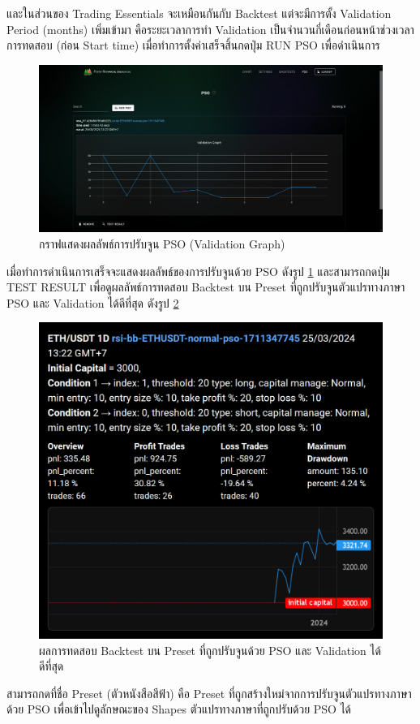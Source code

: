 และในส่วนของ Trading Essentials จะเหมือนกันกับ Backtest แต่จะมีการตั้ง Validation Period (months) เพิ่มเข้ามา คือระยะเวลาการทำ Validation เป็นจำนวนกี่เดือนก่อนหน้าช่วงเวลาการทดสอบ (ก่อน Start time) เมื่อทำการตั้งค่าเสร็จสิ้นกดปุ่ม RUN PSO เพื่อดำเนินการ
\begin{figure}[ht]
    \centering
    \includegraphics[width=\textwidth]{images/web-tuts/pso-result.PNG}
    \caption{กราฟแสดงผลลัพธ์การปรับจูน PSO (Validation Graph)}
    \label{fig:pso-result}
\end{figure}
\FloatBarrier
เมื่อทำการดำเนินการเสร็จจะแสดงผลลัพธ์ของการปรับจูนด้วย PSO ดังรูป \ref{fig:pso-result} และสามารถกดปุ่ม TEST RESULT เพื่อดูผลลัพธ์การทดสอบ Backtest บน Preset ที่ถูกปรับจูนตัวแปรทางภาษา PSO และ Validation ได้ดีที่สุด ดังรูป \ref{fig:pso-test-result}
\begin{figure}[ht]
    \centering
    \includegraphics[scale=0.5]{images/web-tuts/pso-test-result.PNG}
    \caption{ผลการทดสอบ Backtest บน Preset ที่ถูกปรับจูนด้วย PSO และ Validation ได้ดีที่สุด}
    \label{fig:pso-test-result}
\end{figure}
\FloatBarrier
สามารถกดที่ชื่อ Preset (ตัวหนังสือสีฟ้า) คือ Preset ที่ถูกสร้างใหม่จากการปรับจูนตัวแปรทางภาษาด้วย PSO เพื่อเข้าไปดูลักษณะของ Shapes ตัวแปรทางภาษาที่ถูกปรับด้วย PSO ได้